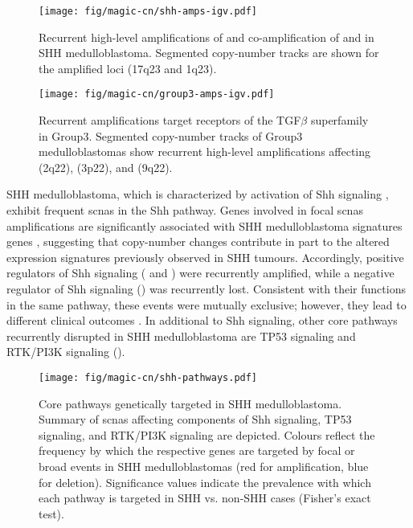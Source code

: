 \clearpage

\begin{SCfigure}[1][t]
	\centering
	\texttt{[image: fig/magic-cn/shh-amps-igv.pdf]}
	\caption[Recurrent amplifications of , , and  in SHH medulloblastoma]
	{
	Recurrent high-level amplifications of  and co-amplification of  and  in SHH medulloblastoma.
	Segmented copy-number tracks are shown for the amplified loci (17q23 and 1q23).
	}
	\label{fig:shh-amps-igv}
\end{SCfigure}

\begin{SCfigure}[1][b]
	\centering
	\texttt{[image: fig/magic-cn/group3-amps-igv.pdf]}
	\caption[Recurrent amplifications target receptors of the TGF$\beta$ superfamily in Group3]
	{
	Recurrent amplifications target receptors of the TGF$\beta$ superfamily in Group3.
	Segmented copy-number tracks of Group3 medulloblastomas show recurrent high-level amplifications affecting  (2q22),  (3p22), and  (9q22).
	}
	\label{fig:group3-amps-igv}
\end{SCfigure}

SHH medulloblastoma, which is characterized by activation of Shh signaling , exhibit frequent \gls{scnas} in the Shh pathway. Genes involved in focal \gls{scnas} amplifications are significantly associated with SHH medulloblastoma signatures genes , suggesting that copy-number changes contribute in part to the altered expression signatures previously observed in SHH tumours. Accordingly, positive regulators of Shh signaling ( and ) were recurrently amplified, while a negative regulator of Shh signaling () was recurrently lost. Consistent with their functions in the same pathway, these events were mutually exclusive; however, they lead to different clinical outcomes . In additional to Shh signaling, other core pathways recurrently disrupted in SHH medulloblastoma are TP53 signaling and RTK/PI3K signaling ().

\begin{figure}[5]
	\centering
	\texttt{[image: fig/magic-cn/shh-pathways.pdf]}
	\caption[Core pathways genetically targeted in SHH medulloblastoma]
	{
	Core pathways genetically targeted in SHH medulloblastoma.
	Summary of \gls{scnas} affecting components of Shh signaling, TP53 signaling, and RTK/PI3K signaling are depicted. Colours reflect the frequency by which the respective genes are targeted by focal or broad events in SHH medulloblastomas (red for amplification, blue for deletion). Significance values indicate the prevalence with which each pathway is targeted in SHH vs. non-SHH cases (Fisher's exact test).
	}
	\label{fig:shh-pathways}
\end{figure}

